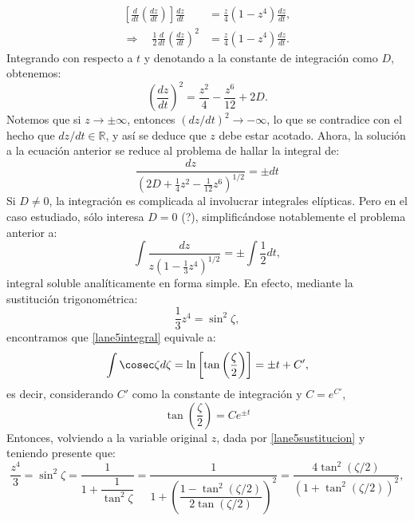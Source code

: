 \begin{align}
\left[\frac{d}{dt}\left(\frac{dz}{dt}\right)\right]\frac{dz}{dt}&=\frac{z}{4}(1-z^4)\frac{dz}{dt},\\
\Rightarrow\quad \frac{1}{2}\frac{d}{dt}\left(\frac{dz}{dt}\right)^2&=\frac{z}{4}(1-z^4)\frac{dz}{dt}.
\end{align}
Integrando con respecto a $t$ y denotando a la constante de integración como $D$, obtenemos:
\begin{equation}
\left(\frac{dz}{dt}\right)^2=\frac{z^2}{4}-\frac{z^6}{12}+2D.
\end{equation}
Notemos que si $z\to\pm\infty$, entonces $(dz/dt)^2\to-\infty$, lo que se contradice con el hecho que $dz/dt\in \mathbb{R}$, y así se deduce que $z$ debe estar acotado. Ahora, la solución a la ecuación anterior se reduce al problema de hallar la integral de:
\begin{equation}
 \frac{dz}{\left(2D+\frac{1}{4}z^2-\frac{1}{12}z^6\right)^{1/2}}=\pm dt
\end{equation}
Si $D\neq0$, la integración es complicada al involucrar integrales elípticas. Pero en el caso estudiado, sólo interesa $D=0$ (?), simplificándose notablemente el problema anterior a:
\begin{equation}\label{lane5integral}
 \int\frac{dz}{z\left(1-\frac{1}{3}z^4\right)^{1/2}}=\pm\int\frac{1}{2}dt,
\end{equation}
integral soluble analíticamente en forma simple. En efecto, mediante la sustitución trigonométrica:
\begin{equation}\label{lane5sustitucion}
\frac{1}{3}z^4=\sin^2 \zeta,
\end{equation}
encontramos que \eqref{lane5integral} equivale a:
\begin{equation}
\int\cosec\zeta d\zeta =\ln\left[\tan\left(\frac{\zeta}{2}\right)\right]=\pm t+C',
\end{equation}
es decir, considerando $C'$ como la constante de integración y $C=e^{C'}$,
\begin{equation}
 \tan\left(\frac{\zeta}{2}\right)=C e^{\pm t}
\end{equation}
Entonces, volviendo a la variable original $z$, dada por \eqref{lane5sustitucion} y teniendo presente que:
\begin{equation}
\frac{z^4}{3}= \sin^2 \zeta=\frac{1}{1+\dfrac{1}
{\tan^2\zeta}}=\frac{1}{1+\left(\dfrac{1-\tan^2(\zeta/2)}
{2\tan(\zeta/2)}\right)^2}=\frac{4\tan^2(\zeta/2)}{\left(1+\tan^2(\zeta/2)\right)^2},
\end{equation}
